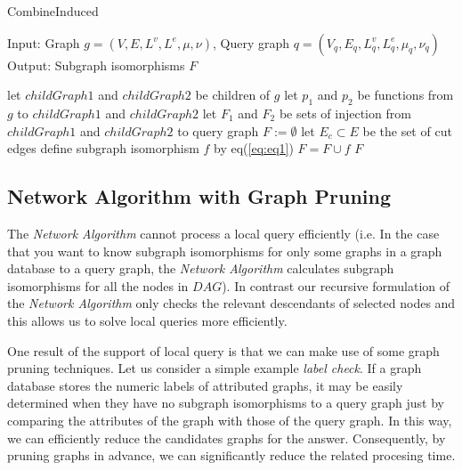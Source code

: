 \begin{algorithm}[t]
\caption{CombineInduced}
\label{alg:alg8}
\begin{algorithmic}
\STATE Input: Graph $g=(V,E,L^v ,L^e ,\mu,\nu)$, Query graph $q=(V_q,E_q,L_q^v ,L_q^e ,\mu_q,\nu_q)$ 
\STATE Output: Subgraph isomorphisms $F$
\end{algorithmic}
\begin{algorithmic}[1]
\STATE let $childGraph1$ and $childGraph2$ be children of $g$
\STATE let $p_1$ and $p_2$ be functions from $g$ to $childGraph1$ and $childGraph2$
\STATE let $F_1$ and $F_2$ be sets of injection from $childGraph1$ and $childGraph2$ to query graph
\STATE $F := \emptyset$
\STATE let $E_c \subset E$ be the set of cut edges
				\STATE define subgraph isomorphism $f$ by eq(\ref{eq:eq1})
				\STATE $F = F \cup f $
		\ENDIF
	\ENDIF
\ENDFOR
\RETURN $F$
\end{algorithmic}
\end{algorithm}

\subsection{Network Algorithm with Graph Pruning}
The \textit{Network Algorithm} cannot process a local query efficiently (i.e. In the case that you want to know subgraph isomorphisms for only some graphs in a 
graph database to a query graph, the \textit{Network Algorithm} calculates subgraph isomorphisms for all the nodes in $DAG$).
In contrast our recursive formulation of the \textit{Network Algorithm} only checks the relevant descendants of selected nodes and this allows us to solve 
local queries more efficiently.

One result of the support of local query is that we can make use of some graph pruning techniques. Let us consider a simple example \textit{label check}. 
If a graph database stores the numeric labels of attributed graphs, it may be easily determined when they have no subgraph isomorphisms to 
a query graph just by comparing the attributes of the graph with those of the query graph.
In this way, we can efficiently reduce the candidates graphs for the answer.
Consequently, by pruning graphs in advance, we can significantly reduce the related procesing time.

